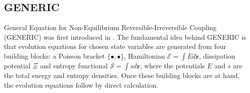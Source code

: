 \documentclass[twoside]{article}
\newcommand{\scS}{\mathscr{S}}
\newcommand{\rr}{{\boldsymbol{r}}}
\newcommand{\scE}{{\mathscr{E}}}
\newcommand{\IP}[1]{ \textcolor{blue}   {\small\texttt{
\texttt{[image: pin\_small.jpeg]} Ilya: #1}} }
\newcommand{\MP}[1]{ \textcolor{Green}   {\small\texttt{
\texttt{[image: pin\_small.jpeg]} Michal: #1}} }
\begin{document}
\subsection{GENERIC}
\begin{comment}
Introduce the GENERIC...... \IP{Can we say something meaningful about the 
relation of GENERIC and symmetric hyperbolic PDEs? Is there are any signs in 
GENERIC when a 1st-order model is symmetric hyperbolic? The energy is convex it 
is good. Can we conclude something else from the properties imposed on the 
brackets?}
\MP{I believe that there is a relation between Hamiltonian mechanics and 
hyperbolicity or Galilean invariance (mostly due to the Jacobi identity). I 
can't, however, formalize it. Maybe, what is the essential property of 
solutions of hyperbolic equations?}
\IP{I believe that the most essential feature of the solutions is that a 
solution is always a wave. So, it is always about wave propagation, either 
dissipative or nondissipative, finite speeds, \\ causality, etc.}

\IP{Also, what can we say about relations of GENERIC and PDEs written in the 
Lagrangian frame? Is there something that makes GENERIC an intrinsically 
Eulerian formalism? Can we build brackets to obtain the Lagrangian elasticity 
for example? Could we somehow discuss these questions in this section or 
elsewhere?}
\MP{The Lagrangian equations can be also cast into GENERIC, e.g. Hamilton 
mechanics is GENERIC. An advantage of GENERIC is that one does not need to rely 
on Lagrangian equations, one can go directly to the Eulerian. It is an 
advantage because the Lagrangian variables cease to have good meaning for 
example when plasticity takes place.}
\IP{Good, I also prefer the Eulerian frame. I would suggest then to write a few 
sentences to explain where the \\ Lagrange-Euler change of the variables is 
``hidden'' in the bracket construction. It will be useful for me as well.}
\MP{It is not hidden there. The Lag-Eu transformation can be used to derive the 
hydrodynamic Poisson bracket, but there are other (much easier) ways.}
\end{comment}

General Equation for Non-Equilibrium Reversible-Irreversible Coupling (GENERIC) 
was first introduced in \cite{GrmelaOttingerI,GrmelaOttingerII}. The 
fundamental idea behind GENERIC is that evolution equations for chosen state 
variables are generated from four building blocks: a Poisson bracket 
$\{\bullet,\bullet\}$, Hamiltonian $\scE = \int E d\rr$, dissipation potential 
$\Xi$ and entropy functional $\scS = \int s d\rr$, 
where the potentials $ E $ and 
$ 
s $ are 
the total energy and entropy densities.  Once these building blocks are at 
hand, 
the evolution equations follow by direct calculation.
\end{document}

